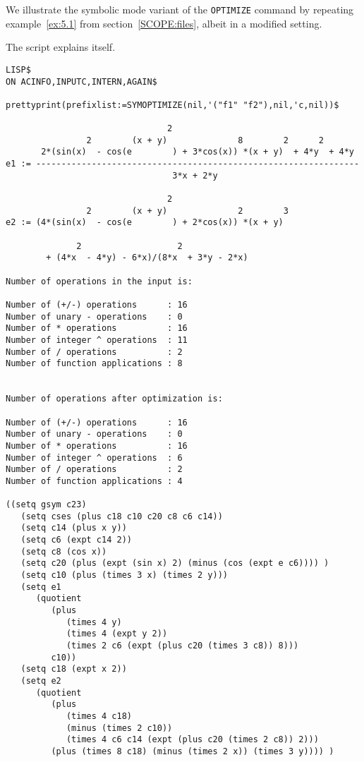 
We illustrate the symbolic mode variant of the {\tt OPTIMIZE} command by
repeating example~\ref{ex:5.1} from section~\ref{SCOPE:files}, albeit in
a modified setting.

\example\label{ex:9.1}

The script explains itself.
{\small
\begin{verbatim}
LISP$
ON ACINFO,INPUTC,INTERN,AGAIN$

prettyprint(prefixlist:=SYMOPTIMIZE(nil,'("f1" "f2"),nil,'c,nil))$

                                2
                2        (x + y)              8        2      2
       2*(sin(x)  - cos(e        ) + 3*cos(x)) *(x + y)  + 4*y  + 4*y
e1 := ----------------------------------------------------------------
                                 3*x + 2*y

                                2
                2        (x + y)              2        3
e2 := (4*(sin(x)  - cos(e        ) + 2*cos(x)) *(x + y)

              2                   2
        + (4*x  - 4*y) - 6*x)/(8*x  + 3*y - 2*x)

Number of operations in the input is:

Number of (+/-) operations      : 16
Number of unary - operations    : 0
Number of * operations          : 16
Number of integer ^ operations  : 11
Number of / operations          : 2
Number of function applications : 8


Number of operations after optimization is:

Number of (+/-) operations      : 16
Number of unary - operations    : 0
Number of * operations          : 16
Number of integer ^ operations  : 6
Number of / operations          : 2
Number of function applications : 4

((setq gsym c23)
   (setq cses (plus c18 c10 c20 c8 c6 c14))
   (setq c14 (plus x y))
   (setq c6 (expt c14 2))
   (setq c8 (cos x))
   (setq c20 (plus (expt (sin x) 2) (minus (cos (expt e c6)))) )
   (setq c10 (plus (times 3 x) (times 2 y)))
   (setq e1
      (quotient
         (plus
            (times 4 y)
            (times 4 (expt y 2))
            (times 2 c6 (expt (plus c20 (times 3 c8)) 8)))
         c10))
   (setq c18 (expt x 2))
   (setq e2
      (quotient
         (plus
            (times 4 c18)
            (minus (times 2 c10))
            (times 4 c6 c14 (expt (plus c20 (times 2 c8)) 2)))
         (plus (times 8 c18) (minus (times 2 x)) (times 3 y)))) )
\end{verbatim}}
